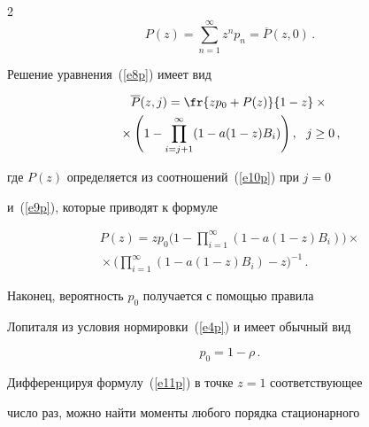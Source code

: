 \begin{multicols}{2}
\begin{equation}


P(z) = \sum_{n=1}^\infty z^n p_n = \overline P(z,0)\,.


\label{e9p}


\end{equation}


Решение уравнения~(\ref{e8p}) имеет вид


\begin{multline}


\overline P(z,j) =


 \fr{zp_0 + P(z)}{ 1-z}\times{}\\


{} \times


\Bigg(


1 - \prod_{i=j+1}^\infty (1 - a(1-z) B_{i})


\Bigg)\,,


\ \ j\ge 0\,, \label{e10p}


\end{multline}


где $P(z)$ определяется из соотношений~(\ref{e10p}) при $j=0$


и~(\ref{e9p}), которые приводят к формуле


\begin{multline}


P(z) = z p_0 \Bigg(


1 - \prod_{i=1}^\infty (1 - a(1-z) B_{i})


\Bigg)\times{}\\


{}\times


\Bigg(


\prod_{i=1}^\infty      (1 - a(1-z) B_{i}) - z


\Bigg)^{-1}\,.


\label{e11p}


\end{multline}


Наконец, вероятность $p_0$ получается с помощью правила


Лопиталя из условия нормировки~(\ref{e4p}) и имеет обычный вид


$$


p_0=1-\rho\,.


$$





Дифференцируя формулу~(\ref{e11p}) в точке $z=1$ соответствующее


число раз, можно найти моменты любого порядка стационарного



\end{multicols}
